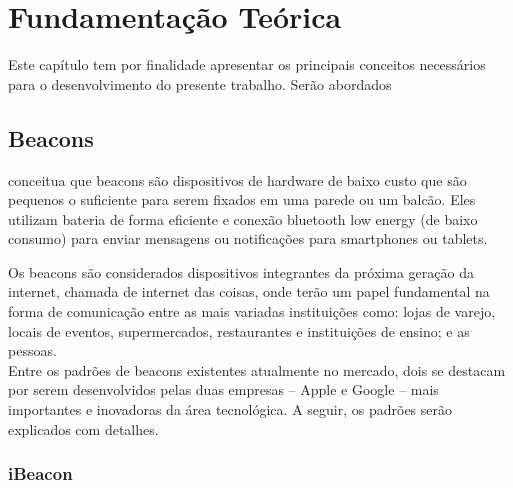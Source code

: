 \chapter{Fundamentação Teórica}
\label{cap:fundamentacao-teorica}

Este capítulo tem por finalidade apresentar os principais conceitos necessários para o desenvolvimento do presente trabalho. Serão abordados 

\section{Beacons}
\label{sec:beacons}

\cite{Danova} conceitua que beacons são dispositivos de hardware de baixo custo que são pequenos o suficiente para serem fixados em uma parede ou um balcão. Eles utilizam bateria de forma eficiente e conexão bluetooth low energy (de baixo consumo) para enviar mensagens ou notificações para smartphones ou tablets.

\begin{figure}[h!]
	\centering
\end{figure}

\indent Os beacons são considerados dispositivos integrantes da próxima geração da internet, chamada de internet das coisas, onde terão um papel fundamental na forma de comunicação entre as mais variadas instituições como: lojas de varejo, locais de eventos, supermercados, restaurantes e instituições de ensino; e as pessoas. \\
\indent Entre os padrões de beacons existentes atualmente no mercado, dois se destacam por serem desenvolvidos pelas duas empresas -- Apple e Google -- mais importantes e inovadoras da área tecnológica. A seguir, os padrões serão explicados com detalhes. 


\subsection{iBeacon}
\label{sec:ibeacon}


